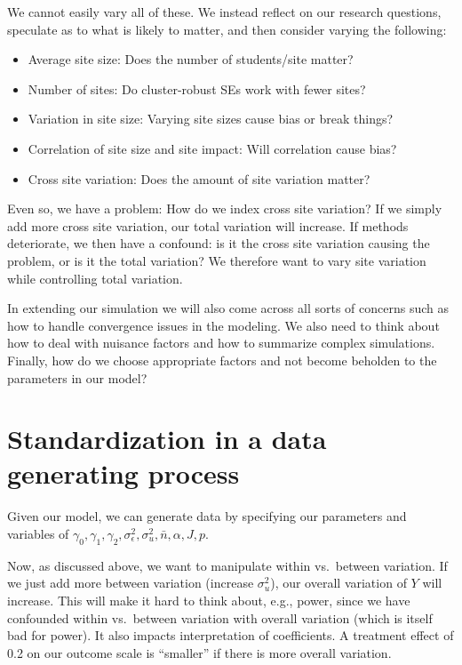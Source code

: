 \documentclass[
]{book}
\providecommand{\tightlist}{%
  \setlength{\itemsep}{0pt}\setlength{\parskip}{0pt}}
\begin{document}
We cannot easily vary all of these.
We instead reflect on our research questions, speculate as to what is likely to matter, and then consider varying the following:

\begin{itemize}
\tightlist
\item
  Average site size: Does the number of students/site matter?
\item
  Number of sites: Do cluster-robust SEs work with fewer sites?
\item
  Variation in site size: Varying site sizes cause bias or break things?
\item
  Correlation of site size and site impact: Will correlation cause bias?
\item
  Cross site variation: Does the amount of site variation matter?
\end{itemize}

Even so, we have a problem: How do we index cross site variation?
If we simply add more cross site variation, our total variation will increase.
If methods deteriorate, we then have a confound: is it the cross site variation causing the problem, or is it the total variation?
We therefore want to vary site variation while controlling total variation.

In extending our simulation we will also come across all sorts of concerns such as how to handle convergence issues in the modeling.
We also need to think about how to deal with nuisance factors and how to summarize complex simulations.
Finally, how do we choose appropriate factors and not become beholden to the parameters in our model?

\hypertarget{standardization-in-a-data-generating-process}{%
\section{Standardization in a data generating process}\label{standardization-in-a-data-generating-process}}

Given our model, we can generate data by specifying our parameters and variables of \(\gamma_{0}, \gamma_{1}, \gamma_{2}, \sigma^2_\epsilon, \sigma^2_u, \bar{n}, \alpha, J, p\).

Now, as discussed above, we want to manipulate within vs.~between variation. If we just add more between variation (increase \(\sigma^2_u\)), our overall variation of \(Y\) will increase.
This will make it hard to think about, e.g., power, since we have confounded within vs.~between variation with overall variation (which is itself bad for power).
It also impacts interpretation of coefficients. A treatment effect of 0.2 on our outcome scale is ``smaller'' if there is more overall variation.
\end{document}
